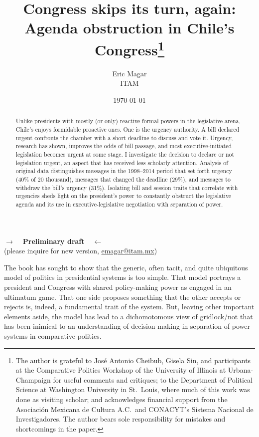 \documentclass[letter,12pt]{article}
\begin{document}
\title{Congress skips its turn, again: \\ Agenda obstruction in Chile's Congress\thanks{The author is grateful to José Antonio Cheibub, Gisela Sin, and participants at the Comparative Politics Workshop of the University of Illinois at Urbana-Champaign for useful comments and critiques; to the Department of Political Science at Washington University in St.\ Louis, where much of this work was done as visiting scholar; and acknowledges financial support from the Asociaci\'on Mexicana de Cultura A.C.\ and CONACYT's Sistema Nacional de Investigadores. The author bears sole responsibility for mistakes and shortcomings in the paper.}}
\author{Eric Magar \\ ITAM }
\date{\today}
\maketitle

\begin{center} \textbf{$\rightarrow$~~Preliminary draft~~$\leftarrow$} \\ (please inquire for new version, \small{\url{emagar@itam.mx}})  \end{center}

\begin{abstract}
\noindent Unlike presidents with mostly (or only) reactive formal powers in the legislative arena, Chile's enjoys formidable proactive ones. One is the urgency authority. A bill declared urgent confronts the chamber with a short deadline to discuss and vote it. Urgency, research has shown, improves the odds of bill passage, and most executive-initiated legislation becomes urgent at some stage. I investigate the decision to declare or not legislation urgent, an aspect that has received less scholarly attention. Analysis of original data distinguishes messages in the 1998--2014 period that set forth urgency (40\% of 20 thousand), messages that changed the deadline (29\%), and messages to withdraw the bill's urgency (31\%). Isolating bill and session traits that correlate with urgencies sheds light on the president's power to constantly obstruct the legislative agenda and its use in executive-legislative negotiation with separation of power.  
\end{abstract}

\onehalfspacing

The book has sought to show that the generic, often tacit, and quite ubiquitous model of politics in presidential systems is too simple. That model portrays a president and Congress with shared policy-making power as engaged in an ultimatum game. That one side proposes something that the other accepts or rejects is, indeed, a fundamental trait of the system. But, leaving other important elements aside, the model has lead to a dichomotomous view of gridlock/not that has been inimical to an understanding of decision-making in separation of power systems in comparative politics.
\end{document}

